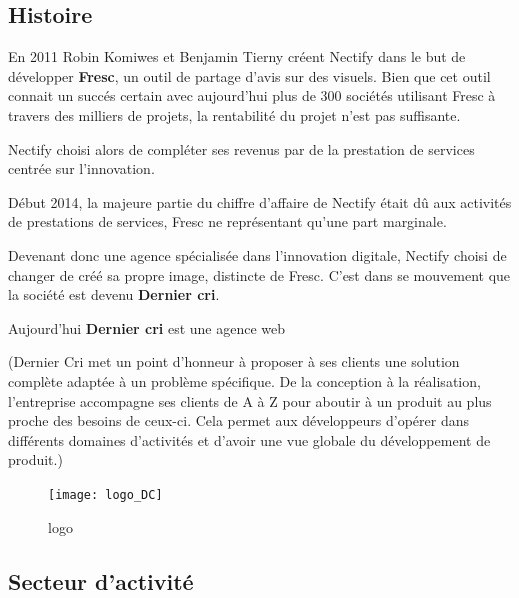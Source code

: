 \documentclass[12pt,a4paper]{article}
\begin{document}
  \bigskip

  \subsection{Histoire}\label{histoire}

  \bigskip

  En 2011 Robin Komiwes et Benjamin Tierny créent Nectify dans le but de
  développer \textbf{Fresc}, un outil de partage d'avis sur des visuels.
  Bien que cet outil connait un succés certain avec aujourd'hui plus de
  300 sociétés utilisant Fresc à travers des milliers de projets, la
  rentabilité du projet n'est pas suffisante.

  \bigskip

  Nectify choisi alors de compléter ses revenus par de la prestation de
  services centrée sur l'innovation.

  \bigskip

  Début 2014, la majeure partie du chiffre d'affaire de Nectify était dû
  aux activités de prestations de services, Fresc ne représentant qu'une
  part marginale.

  \bigskip

  Devenant donc une agence spécialisée dans l'innovation digitale, Nectify
  choisi de changer de créé sa propre image, distincte de Fresc. C'est
  dans se mouvement que la société est devenu \textbf{Dernier cri}.

  \bigskip

  Aujourd'hui \textbf{Dernier cri} est une agence web

  (Dernier Cri met un point d'honneur à proposer à ses clients une
  solution complète adaptée à un problème spécifique. De la conception à
  la réalisation, l'entreprise accompagne ses clients de A à Z pour
  aboutir à un produit au plus proche des besoins de ceux-ci. Cela permet
  aux développeurs d'opérer dans différents domaines d'activités et
  d'avoir une vue globale du développement de produit.)

  \bigskip

  \begin{figure}
  \centering
  \texttt{[image: logo\_DC]}
  \caption{logo}
  \end{figure}

  \newpage

  \subsection{Secteur d'activité}\label{secteur-dactivituxe9}
\end{document}

